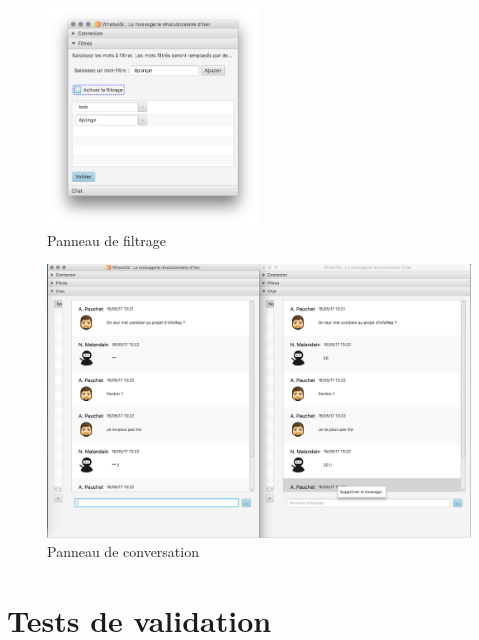 \documentclass[11pt,dvipsnames,svgnames]{report}
\begin{document}
\begin{figure}[H]
\caption{Panneau de filtrage}
\label{illuFiltre}
\centerline{\includegraphics[width=0.5\textwidth]{images/illuFiltres.png}}
\end{figure}

\begin{figure}[H]
\caption{Panneau de conversation}
\label{illuConv}
\centerline{\includegraphics[width=1.2\textwidth]{images/illuConv.png}}
\end{figure}


\section{Tests de validation}
\end{document}
